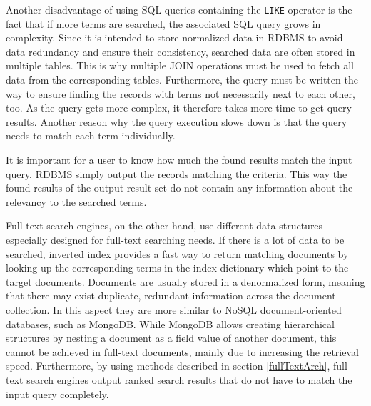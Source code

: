Another disadvantage of using SQL queries containing the \texttt{LIKE} operator is the fact that if more terms are searched, the associated SQL query grows in complexity.
Since it is intended to store normalized data in RDBMS to avoid data redundancy and ensure their consistency, searched data are often stored in multiple tables.
This is why multiple JOIN operations must be used to fetch all data from the corresponding tables.
Furthermore, the query must be written the way to ensure finding the records with terms not necessarily next to each other, too. 
As the query gets more complex, it therefore takes more time to get query results.
Another reason why the query execution slows down is that the query needs to match each term individually.

It is important for a user to know how much the found results match the input query. 
RDBMS simply output the records matching the criteria.
This way the found results of the output result set do not contain any information about the relevancy to the searched terms. 

Full-text search engines, on the other hand, use different data structures especially designed for full-text searching needs.
If there is a lot of data to be searched, inverted index provides a fast way to return matching documents by looking up the corresponding terms in the index dictionary which point to the target documents.
Documents are usually stored in a denormalized form, meaning that there may exist duplicate, redundant information across the document collection.
In this aspect they are more similar to NoSQL document-oriented databases, such as MongoDB.
While MongoDB allows creating hierarchical structures by nesting a document as a field value of another document, this cannot be achieved in full-text documents, mainly due to increasing the retrieval speed.
Furthermore, by using methods described in section \ref{fullTextArch}, full-text search engines output ranked search results that do not have to match the input query completely.




